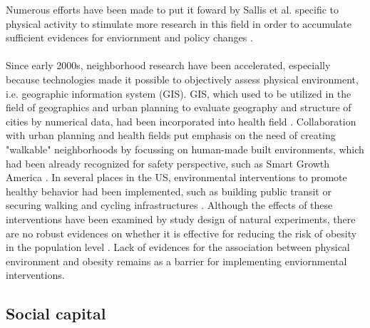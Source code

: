 \documentclass[12]{article}
\begin{document}
Numerous efforts have been made to put it foward by Sallis et al. specific to physical activity to stimulate more research in this field in order to accumulate sufficient evidences for enviornment and policy changes \cite{sallis1998environmental}. 
\paragraph{}
Since early 2000s, neighborhood research have been accelerated, especially because technologies made it possible to objectively assess physical environment, i.e. geographic information system (GIS). GIS, which used to be utilized in the field of geographics and urban planning to evaluate geography and structure of cities by numerical data, had been incorporated into health field  \cite{frank2005linking}. Collaboration with urban planning and health fields put emphasis on the need of creating "walkable" neighborhoods by focussing on human-made built environments, which had been already recognized for safety perspective, such as Smart Growth America \cite{smartgrowth}.
In several places in the US, environmental interventions to promote healthy behavior had been implemented, such as building public transit or securing walking and cycling infrastructures \cite{brown2015transit,macdonald2010effect}. Although the effects of these interventions have been examined by study design of natural experiments, there are no robust evidences on whether it is effective for reducing the risk of obesity in the population level \cite{tseng2018effectiveness}. Lack of evidences for the association between physical environment and obesity remains as a barrier for implementing enviornmental interventions. 

\subsection{Social capital}
\end{document}
